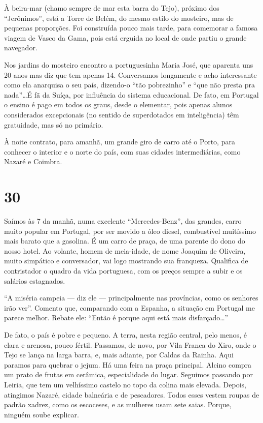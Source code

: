 À beira-mar (chamo sempre de mar esta barra do Tejo), próximo dos ``Jerônimos'', está a Torre de Belém, do mesmo estilo do mosteiro, mas de pequenas proporções. Foi construída pouco mais tarde, para comemorar a famosa viagem de Vasco da Gama, pois está erguida no local de onde partiu o grande navegador.

Nos jardins do mosteiro encontro a portuguesinha Maria José, que aparenta uns 20 anos mas diz que tem apenas 14. Conversamos longamente e acho interessante como ela anarquisa o seu país, dizendo-o ``tão pobrezinho'' e ``que não presta pra nada''\ldots É fã da Suíça, por influência do sistema educacional. De fato, em Portugal o ensino é pago em todos os graus, desde o elementar, pois apenas alunos considerados excepcionais (no sentido de superdotados em inteligência) têm gratuidade, mas só no primário.

À noite contrato, para amanhã, um grande giro de carro até o Porto, para conhecer o interior e o norte do país, com suas cidades intermediárias, como Nazaré e Coimbra.

\section*{30 \adfflatleafright {}}
Saímos às 7 da manhã, numa excelente ``Mercedes-Benz'', das grandes, carro muito popular em Portugal, por ser movido a óleo diesel, combustível muitíssimo mais barato que a gasolina. É um carro de praça, de uma parente do dono do nosso hotel. Ao volante, homem de meia-idade, de nome Joaquim de Oliveira, muito simpático e conversador, vai logo mostrando sua franqueza. Qualifica de contristador o quadro da vida portuguesa, com os preços sempre a subir e os salários estagnados.

``A miséria campeia --- diz ele --- principalmente nas províncias, como os senhores irão ver''. Comento que, comparando com a Espanha, a situação em Portugal me parece melhor. Rebate ele: ``Então é porque aqui está mais disfarçado\ldots''

De fato, o país é pobre e pequeno. A terra, nesta região central, pelo menos, é clara e arenosa, pouco fértil. Passamos, de novo, por Vila Franca do Xiro, onde o Tejo se lança na larga barra, e, mais adiante, por Caldas da Rainha. Aqui paramos para quebrar o jejum. Há uma feira na praça principal. Alcino compra um prato de frutas em cerâmica, especialidade do lugar. Seguimos passando por Leiria, que tem um velhíssimo castelo no topo da colina mais elevada. Depois, atingimos Nazaré, cidade balneária e de pescadores. Todos esses vestem roupas de padrão xadrez, como os escoceses, e as mulheres usam sete saias. Porque, ninguém soube explicar.

